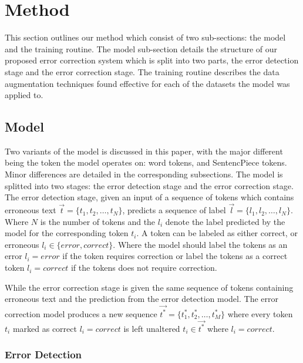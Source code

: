 \section{Method}

This section outlines our method which consist of two sub-sections: the model and the training routine. The model sub-section details the structure of our proposed error correction system which is split into two parts, the error detection stage and the error correction stage. The training routine describes the data augmentation techniques found effective for each of the datasets the model was applied to.

\subsection{Model}

Two variants of the model is discussed in this paper, with the major different being the token the model operates on: word tokens, and SentencPiece tokens. Minor differences are detailed in the corresponding subsections. The model is splitted into two stages: the error detection stage and the error correction stage. The error detection stage, given an input of a sequence of tokens which contains erroneous text \(\vec{t} = \{t_{1}, t_{2}, \dots, t_{N}\}\), predicts a sequence of label \(\vec{l} = \{l_{1}, l_{2}, \dots, l_{N}\}\). Where \(N\) is the number of tokens and the \(l_{i}\) denote the label predicted by the model for the corresponding token \(t_{i}\). A token can be labeled as either correct, or erroneous \(l_{i} \in \{error, correct\}\). Where the model should label the tokens as an error \(l_i = error\) if the token requires correction or label the tokens as a correct token \(l_i = correct\) if the tokens does not require correction.

While the error correction stage is given the same sequence of tokens containing erroneous text and the prediction from the error detection model. The error correction model produces a new sequence \(\vec{t^*} = \{t^*_{1}, t^*_{2}, \dots, t^*_{M}\}\) where every token \(t_i\) marked as correct \(l_i = correct\) is left unaltered \(t_i \in \vec{t^*}\) where \(l_i = correct\).

\subsubsection{Error Detection}

